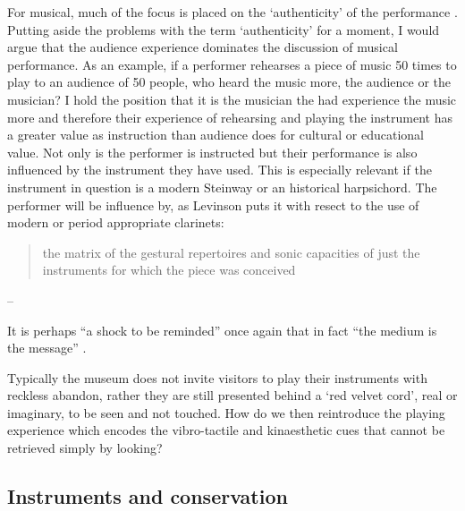 For musical, much of the focus is placed on the `authenticity' of the performance \cite{laurenson_authenticity_2006, davies_authenticity_2001}. 
Putting aside the problems with the term `authenticity' for a moment, I would argue that the audience experience dominates the discussion of musical performance.
As an example, if a performer rehearses a piece of music 50 times to play to an audience of 50 people, who heard the music more, the audience or the musician?
I hold the position that it is the musician the had experience the music more and therefore their experience of rehearsing and playing the instrument has a greater value as instruction than audience does for cultural or educational value.
Not only is the performer is instructed but their performance is also influenced by the instrument they have used.
This is especially relevant if the instrument in question is a modern Steinway or an historical harpsichord.
The performer will be influence by, as Levinson puts it with resect to the use of modern or period appropriate clarinets:

\begin{quotation}
    the matrix of the gestural repertoires and sonic capacities of just the instruments for which the piece was conceived
\end{quotation}
\begin{flushright}
-- \cite[][]{levinson_music_1990}
\end{flushright}

It is perhaps ``a shock to be reminded'' once again that in fact ``the medium is the message'' \cite{mcluhan_understanding_1964}.

Typically the museum does not invite visitors to play their instruments with reckless abandon, rather they are still presented behind a `red velvet cord', real or imaginary, to be seen and not touched.
How do we then reintroduce the playing experience which encodes the vibro-tactile and kinaesthetic cues that cannot be retrieved simply by looking?

\subsection{Instruments and conservation}

